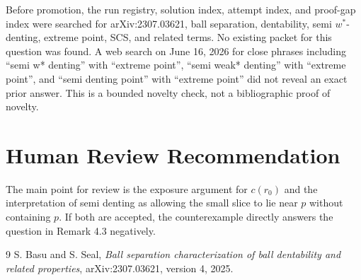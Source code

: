 \documentclass[11pt]{article}
\begin{document}
Before promotion, the run registry, solution index, attempt index, and
proof-gap index were searched for arXiv:2307.03621, ball separation,
dentability, semi \(w^*\)-denting, extreme point, SCS, and related terms. No
existing packet for this question was found. A web search on June 16, 2026
for close phrases including ``semi w* denting'' with ``extreme point'',
``semi weak* denting'' with ``extreme point'', and ``semi denting point''
with ``extreme point'' did not reveal an exact prior answer. This is a bounded
novelty check, not a bibliographic proof of novelty.

\section*{Human Review Recommendation}

The main point for review is the exposure argument for \(c(r_0)\) and the
interpretation of semi denting as allowing the small slice to lie near \(p\)
without containing \(p\). If both are accepted, the counterexample directly
answers the question in Remark 4.3 negatively.

\begin{thebibliography}{9}
S. Basu and S. Seal,
\emph{Ball separation characterization of ball dentability and related
properties}, arXiv:2307.03621, version 4, 2025.
\end{thebibliography}
\end{document}
